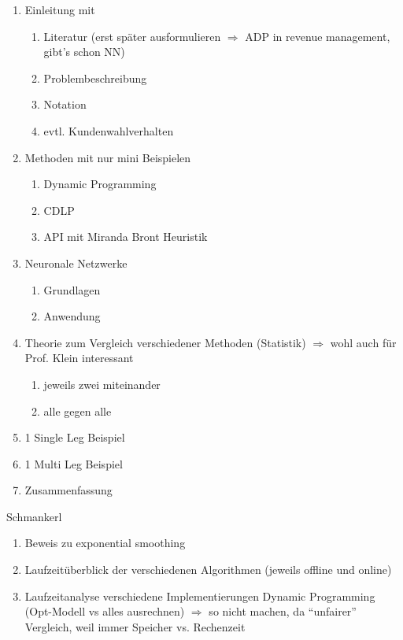 \begin{enumerate}
	\item Einleitung mit 
	\begin{enumerate}
		\item Literatur (erst später ausformulieren $\Rightarrow$ ADP in revenue management, gibt's schon NN)
		\item Problembeschreibung
		\item Notation
		\item evtl. Kundenwahlverhalten
	\end{enumerate} 
	\item Methoden mit nur mini Beispielen
	\begin{enumerate}
		\item Dynamic Programming
		\item CDLP
		\item API mit Miranda Bront Heuristik
	\end{enumerate}
	\item Neuronale Netzwerke
	\begin{enumerate}
		\item Grundlagen
		\item Anwendung
	\end{enumerate}
	\item Theorie zum Vergleich verschiedener Methoden (Statistik) $\Rightarrow$ wohl auch für Prof. Klein interessant
	\begin{enumerate}
		\item jeweils zwei miteinander
		\item alle gegen alle
	\end{enumerate}
	\item 1 Single Leg Beispiel
	\item 1 Multi Leg Beispiel
	\item Zusammenfassung
\end{enumerate}

Schmankerl

\begin{enumerate}
	\item Beweis zu exponential smoothing
	\item Laufzeitüberblick der verschiedenen Algorithmen (jeweils offline und online)
	\item Laufzeitanalyse verschiedene Implementierungen Dynamic Programming (Opt-Modell vs alles ausrechnen) $\Rightarrow$ so nicht machen, da \enquote{unfairer} Vergleich, weil immer Speicher vs. Rechenzeit
\end{enumerate}